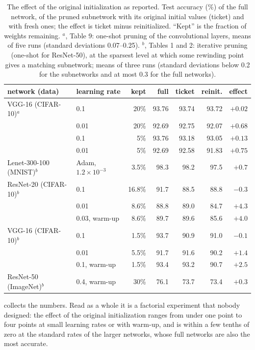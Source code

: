 \begin{refsection}
\begin{table}[t]
\centering\small\setlength{\tabcolsep}{3.6pt}
\begin{tabular}{@{}llrrrrr@{}}
\toprule
network (data) & learning rate & kept & full & ticket & reinit. & effect\\
\midrule
VGG-16 (CIFAR-10)$^a$ & 0.1 & 20\% & 93.76 & 93.74 & 93.72 & $+0.02$\\
 & 0.01 & 20\% & 92.69 & 92.75 & 92.07 & $+0.68$\\
 & 0.1 & 5\% & 93.76 & 93.18 & 93.05 & $+0.13$\\
 & 0.01 & 5\% & 92.69 & 92.58 & 91.83 & $+0.75$\\
\midrule
Lenet-300-100 (MNIST)$^b$ & Adam, $1.2\times10^{-3}$ & 3.5\% & 98.3 & 98.2 & 97.5 & $+0.7$\\
ResNet-20 (CIFAR-10)$^b$ & 0.1 & 16.8\% & 91.7 & 88.5 & 88.8 & $-0.3$\\
 & 0.01 & 8.6\% & 88.8 & 89.0 & 84.7 & $+4.3$\\
 & 0.03, warm-up & 8.6\% & 89.7 & 89.6 & 85.6 & $+4.0$\\
VGG-16 (CIFAR-10)$^b$ & 0.1 & 1.5\% & 93.7 & 90.9 & 91.0 & $-0.1$\\
 & 0.01 & 5.5\% & 91.7 & 91.6 & 90.2 & $+1.4$\\
 & 0.1, warm-up & 1.5\% & 93.4 & 93.2 & 90.7 & $+2.5$\\
ResNet-50 (ImageNet)$^b$ & 0.4, warm-up & 30\% & 76.1 & 73.7 & 73.4 & $+0.3$\\
\bottomrule
\end{tabular}
\caption{The effect of the original initialization as reported. Test accuracy (\%) of the full network, of the pruned subnetwork with its original initial values (ticket) and with fresh ones; the effect is ticket minus reinitialized. ``Kept'' is the fraction of weights remaining. $^a$\textcite{LiuEtAl2019}, Table 9: one-shot pruning of the convolutional layers, means of five runs (standard deviations 0.07--0.25). $^b$\textcite{FrankleEtAl2020}, Tables 1 and 2: iterative pruning (one-shot for ResNet-50), at the sparsest level at which some rewinding point gives a matching subnetwork; means of three runs (standard deviations below 0.2 for the subnetworks and at most 0.3 for the full networks).}
\label{tab:ablations:literature}
\end{table}

 collects the numbers. Read as a whole it is a factorial experiment that nobody designed: the effect of the original initialization ranges from under one point to four points at small learning rates or with warm-up, and is within a few tenths of zero at the standard rates of the larger networks, whose full networks are also the most accurate.


\end{refsection}
